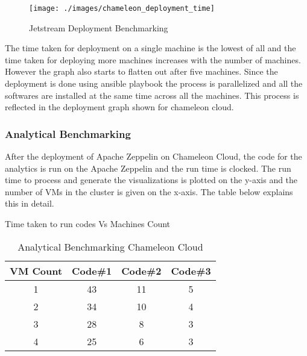 \documentclass[9pt,twocolumn,twoside]{../../styles/osajnl}
\begin{document}
	\begin{figure}
		\texttt{[image: ./images/chameleon\_deployment\_time]}
		\caption{Jetstream Deployment Benchmarking}
		\label{fig:Chameleon Deployment Benchmarking}
	\end{figure}
	
	The time taken for deployment on a single machine is the lowest 
	of 
	all and the time taken for deploying more machines increases with 
	the 
	number of machines. However the graph also starts to flatten out 
	after five machines. Since the deployment is done using ansible 
	playbook the process is parallelized and all the softwares are 
	installed at the same time across all the machines. This 
	process 
	is reflected in the deployment graph shown for chameleon cloud.
	
	\subsubsection{Analytical Benchmarking}
	
	After the deployment of Apache Zeppelin on Chameleon Cloud, the 
	code 
	for the analytics is run on the Apache Zeppelin and the run time 
	is 
	clocked. The run time to process and generate the visualizations 
	is 
	plotted on the y-axis and the number of VMs in the cluster is 
	given 
	on the x-axis. The table below explains this in detail.
	
	\begin{table}[ht]
		\caption{Analytical Benchmarking Chameleon Cloud} %
		\centering %
		Time taken to run codes Vs Machines Count \\
		\begin{tabular}{c c c c} %
			\hline
			\hline %
			VM Count & Code\#1 & Code\#2 & Code\#3 \\ [0.5ex] %
			\hline %
			1 & 43 & 11 & 5 \\ %
			2 & 34 & 10 & 4 \\
			3 & 28 & 8 & 3 \\
			4 & 25 & 6 & 3 \\ [1ex] %
			\hline %
		\end{tabular}
		\label{table:nonlin} %
	\end{table}
	
\end{document}
